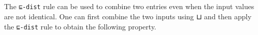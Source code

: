\begin{fence}
\begin{code}%
\>[0]\AgdaSpace{}%
\AgdaSymbol{:}\AgdaSpace{}%
\AgdaSpace{}%
\AgdaSymbol{\{}\AgdaSpace{}%
\AgdaSpace{}%
\AgdaSpace{}%
\AgdaSymbol{\}}\<%
\\
\>[0][@{}l@{\AgdaIndent{0}}]%
\>[2]%
\>[248I]\AgdaSpace{}%
\AgdaSpace{}%
%
\>[12]%
\>[15]\AgdaSpace{}%
\AgdaSpace{}%
\<%
\\
\>[.][@{}l@{}]\<[248I]%
\>[4]\AgdaComment{-----------------------}\<%
\\
%
\>[2]\AgdaSpace{}%
\AgdaSymbol{(}\AgdaSpace{}%
\AgdaSpace{}%
\AgdaSymbol{)}\AgdaSpace{}%
\AgdaSpace{}%
\AgdaSymbol{(}\AgdaSpace{}%
\AgdaSpace{}%
\AgdaSymbol{)}\<%
\\
\>[0]\AgdaSpace{}%
\AgdaSpace{}%
\AgdaSpace{}%
\AgdaSymbol{=}\AgdaSpace{}%
\AgdaSpace{}%
\AgdaSymbol{(}\AgdaSpace{}%
\AgdaSymbol{)}\AgdaSpace{}%
\AgdaSymbol{(}\AgdaSpace{}%
\AgdaSymbol{)}\<%
\end{code}
\end{fence}

The \texttt{⊑-dist} rule can be used to combine two entries even when
the input values are not identical. One can first combine the two inputs
using ⊔ and then apply the \texttt{⊑-dist} rule to obtain the following
property.

